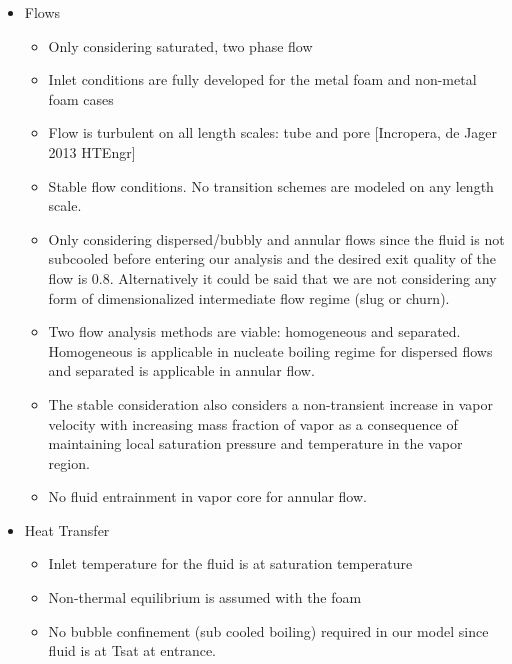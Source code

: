 \documentclass[asme2ejs.tex]{subfiles}
\begin{document}
\begin{itemize}
\item Flows
	\begin{itemize}
		\item 	Only considering saturated, two phase flow 
		\item 	Inlet conditions are fully developed for the metal foam and non-metal foam cases
		\item 	Flow is turbulent on all length scales: tube and pore [Incropera, de Jager 2013 HTEngr]
		\item 	Stable flow conditions. No transition schemes are modeled on any length scale.
		\item 	Only considering dispersed/bubbly and annular flows since the fluid is not subcooled before entering our analysis and the desired exit quality of the flow is 0.8. 
		Alternatively it could be said that we are not considering any form of dimensionalized intermediate flow regime (slug or churn).
		\item	Two flow analysis methods are viable: homogeneous and separated. 
		Homogeneous is applicable in nucleate boiling regime for dispersed flows and separated is applicable in annular flow.
		\item 	The stable consideration also considers a non-transient increase in vapor velocity with increasing mass fraction of vapor as a consequence of maintaining local saturation pressure and temperature in the vapor region.
		\item 	No fluid entrainment in vapor core for annular flow.
	\end{itemize}

\item Heat Transfer
	\begin{itemize}
		\item 	Inlet temperature for the fluid is at saturation temperature
		\item 	Non-thermal equilibrium is assumed with the foam
		\item 	No bubble confinement  (sub cooled boiling) required in our model since fluid is at Tsat at entrance.
	\end{itemize}
\end{itemize}
\end{document}
